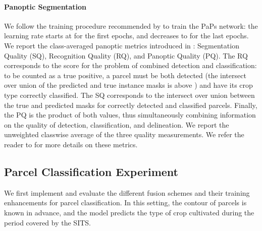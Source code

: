 \paragraph{\bf Panoptic Segmentation} We follow the training procedure recommended by \citet{garnot2021utae} to train the PaPs network: the learning rate starts at  for the first  epochs, and decreases to  for the last  epochs. We report the class-averaged panoptic metrics introduced in \citet{kirillov2019panoptic}: Segmentation Quality (SQ), Recognition Quality (RQ), and Panoptic Quality (PQ). 
The RQ corresponds to the  score for the problem of combined detection and classification: to be counted as a true positive, a parcel must be both detected (the intersect over union of the predicted and true instance masks is above ) and have its crop type correctly classified.
The SQ corresponds to the intersect over union between the true and predicted masks for correctly detected and classified parcels. Finally, the PQ is the product of both values, thus simultaneously combining information on the quality of detection, classification, and delineation. We report the unweighted classwise average of the three quality measurements. We refer the reader to \citet{kirillov2019panoptic} for more details on these metrics.



\subsection{Parcel Classification Experiment}
We first implement and evaluate the different fusion schemes and their training enhancements for parcel classification. In this setting, the contour of parcels is known in advance, and the model predicts the type of crop cultivated during the period covered by the SITS.

